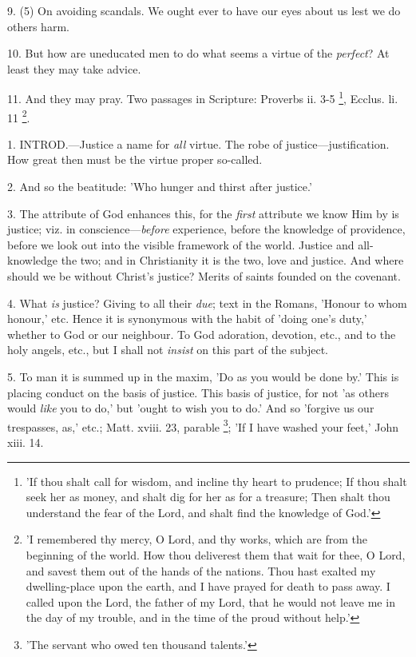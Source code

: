9. (5) On avoiding scandals. We ought ever to
have our eyes about us lest we do others harm.

10. But how are uneducated men to do what seems a
virtue of the \emph{perfect}? At least they may take advice.

11. And they may pray. Two passages in Scripture:
Proverbs ii. 3-5 \footnote{'If thou shalt call for
wisdom, and incline thy heart to prudence; If thou shalt seek her as
money, and shalt dig for her as for a treasure; Then shalt thou
understand the fear of the Lord, and shalt find the knowledge of God.'},
Ecclus. li. 11 \footnote{'I remembered thy mercy,
O Lord, and thy works, which are from the beginning of the world. How
thou deliverest them that wait for thee, O Lord, and savest them out
of the hands of the nations. Thou hast exalted my dwelling-place upon
the earth, and I have prayed for death to pass away. I called upon the
Lord, the father of my Lord, that he would not leave me in the day of
my trouble, and in the time of the proud without help.'}.


1. INTROD.—Justice
a name for \emph{all} virtue. The robe of justice—justification. How
great then must be the virtue proper so-called.

2. And so the beatitude: 'Who hunger and thirst
after justice.'

3. The attribute of God enhances this, for the \emph{first}
attribute we know Him by is justice; viz. in conscience—\emph{before}
experience, before the knowledge of providence, before we look out
into the visible framework of the world. Justice and all-knowledge the
two; and in Christianity it is the two, love and justice. And where
should we be without Christ's justice? Merits of saints founded on the
covenant.

4. What \emph{is} justice? Giving to all their \emph{due};
text in the Romans, 'Honour to whom honour,' etc. Hence it is
synonymous with the habit of 'doing one's duty,' whether to God or our
neighbour. To God adoration, devotion, etc., and to the holy angels,
etc., but I shall not \emph{insist} on this part of the subject.

5. To man it is summed up in the maxim, 'Do as
you would be done by.' This is placing conduct on the basis of
justice. This basis of justice, for not 'as others would \emph{like}
you to do,' but 'ought to wish you to do.' And so 'forgive us our
trespasses, as,' etc.; Matt. xviii. 23, parable \footnote{'The servant who owed
ten thousand talents.'}; 'If I have washed your feet,' John xiii. 14.

